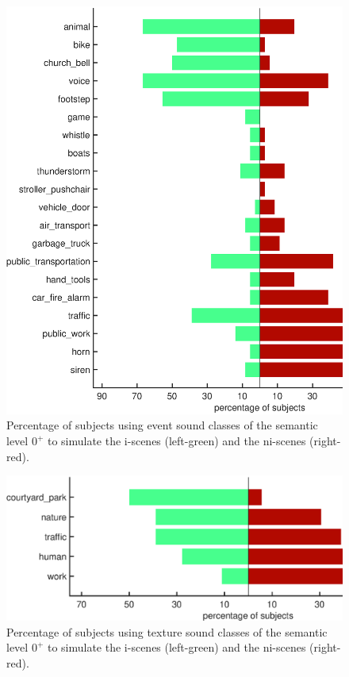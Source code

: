 \documentclass[twoside,twocolumn]{article}
\begin{document}
\begin{figure}[t!]
\begin{center}
\includegraphics[width=.4\paperwidth]{../gfxMatlab/xp1_class_1.eps}
    \caption{\label{fig:xp1_class_1} Percentage of subjects using event sound classes of the semantic level $0^{+}$ to simulate the i-scenes (left-green) and the ni-scenes (right-red).}
        \end{center}
\end{figure}

\begin{figure}[t!]
\begin{center}
\includegraphics[width=.4\paperwidth]{../gfxMatlab/xp1_class_2.eps}
    \caption{\label{fig:xp1_class_2} Percentage of subjects using texture sound classes of the semantic level $0^{+}$ to simulate the i-scenes (left-green) and the ni-scenes (right-red).}
    \end{center}
\end{figure}
\end{document}
